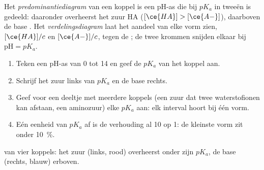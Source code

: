 \begin{definition}\label{def:g12:buffers-predominance:predominance}
Het \emph{predominantiediagram} van een koppel
is een pH-as die bij $pK_a$ in tweeën is gedeeld: daaronder overheerst het
zuur HA ($[\ce{HA}] > [\ce{A-}]$), daarboven de base . Het
\emph{verdelingsdiagram} laat het aandeel van
elke vorm zien,
$[\ce{HA}]/c$ en $[\ce{A-}]/c$, tegen de ; de twee krommen snijden
elkaar bij
$\mathrm{pH} = pK_a$.
\end{definition}

\begin{method}\label{met:g12:buffers-predominance:diagram}
\begin{enumerate}
  \item Teken een pH-as van 0 tot 14 en geef de $pK_a$ van het koppel
        aan.
  \item Schrijf het zuur links van $pK_a$ en de base rechts.
  \item Geef voor een deeltje met meerdere koppels (een zuur dat twee
        waterstofionen kan afstaan, een aminozuur) elke $pK_a$ aan: elk
        interval hoort bij één vorm.
  \item Eén eenheid van $pK_a$ af is de verhouding al 10 op 1: de kleinste
        vorm zit onder \qty{10}{\percent}.
\end{enumerate}
\end{method}

\begin{omfigure}

{\small {} van vier koppels: het zuur (links, rood)
overheerst onder zijn $pK_a$, de base (rechts, blauw) erboven.}
\end{omfigure}

